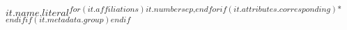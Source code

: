 $it.name.literal$\textsuperscript{$for(it.affiliations)$$it.number$$sep$,$endfor$$if(it.attributes.corresponding)$*$endif$$if(it.metadata.group)$\textpilcrow$endif$}
